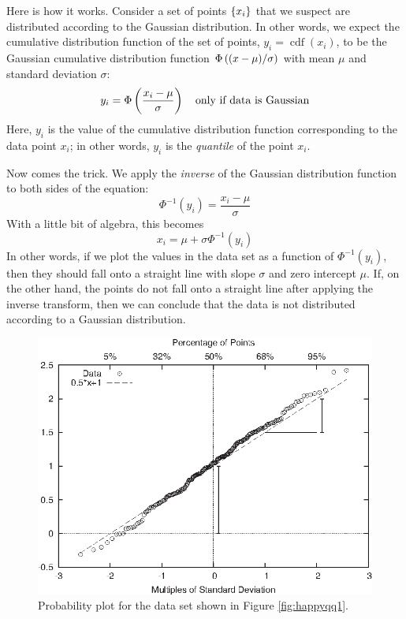 Here is how it works. Consider a set of points $\left\{ x_i \right\} $ that we
suspect are distributed according to the Gaussian distribution. In 
other words, we expect the cumulative distribution function of the
set\vadjust{\pagebreak} of points, $y_i = \operatorname{cdf}(x_i)$, to be the Gaussian 
cumulative distribution function $\Phi\left(  (x-\mu)/\sigma  \right)$
with mean $\mu$ and standard deviation $\sigma$:
%
\[
y_i = \Phi\left(  \frac{x_i-\mu}{\sigma }  \right) 
  \quad \hbox{only if data is Gaussian}
\]
%
Here, $y_i$ is the value of the cumulative distribution function 
corresponding to the data point $x_i$; in other words, $y_i$ is
the \emph{quantile} of the point $x_i$.

Now comes the trick. We apply the \emph{inverse} of the Gaussian
distribution function to both sides of the equation:
%
\[
\Phi^{-1}(y_i) = \frac{x_i-\mu}{\sigma }
\]
%
With a little bit of algebra, this becomes
%
\[
x_i = \mu + \sigma \Phi^{-1}(y_i)
\]
%
In other words, if we plot the values in the data set as a function of
$\Phi^{-1}(y_i)$, then they should fall onto a straight line with
slope $\sigma$ and zero intercept $\mu$. If, on the other hand, the
points do not fall onto a straight line after applying the inverse
transform, then we can conclude that the data is not distributed
according to a Gaussian distribution.

\begin{figure}
  \centerline{\includegraphics{img/happyqq2}}
  \caption{Probability plot for the data set shown in Figure 
    \ref{fig:happyqq1}.}
  \label{fig:happyqq2}
\end{figure}


